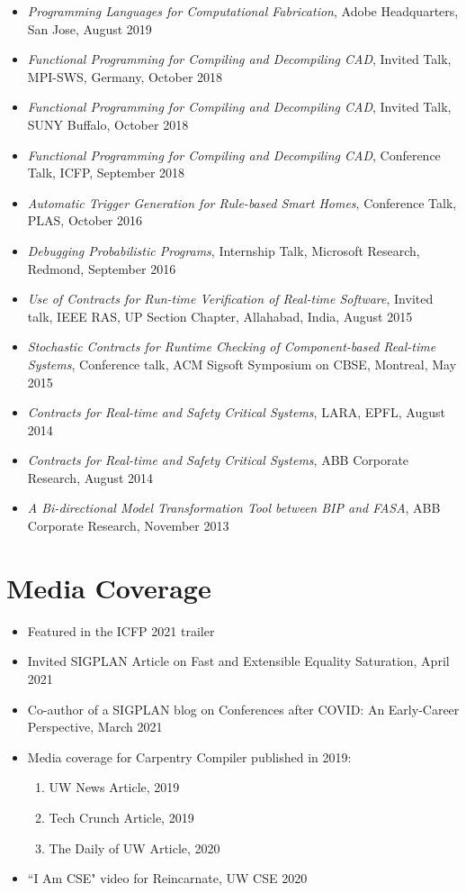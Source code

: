 \documentclass[margin, 10pt]{res} %
\begin{document}
\begin{resume}
\begin{itemize}[itemsep=.7pt]
 \item {\sl Programming Languages for Computational Fabrication}, Adobe Headquarters, San Jose, August 2019
 \item {\sl Functional Programming for Compiling and Decompiling CAD}, Invited Talk, MPI-SWS, Germany, October 2018
 \item {\sl Functional Programming for Compiling and Decompiling CAD}, Invited Talk, SUNY Buffalo, October 2018
 \item {\sl Functional Programming for Compiling and Decompiling CAD}, Conference  Talk, ICFP, September 2018
 \item {\sl Automatic Trigger Generation for Rule-based Smart Homes}, Conference Talk, PLAS, October 2016
 \item {\sl Debugging Probabilistic Programs}, Internship Talk, Microsoft Research, Redmond, September 2016
 \item {\sl Use of Contracts for Run-time Verification of Real-time Software}, Invited talk, IEEE RAS, UP Section Chapter, Allahabad, India, August 2015
 \item {\sl Stochastic Contracts for Runtime Checking of Component-based Real-time Systems}, Conference talk, ACM Sigsoft Symposium on CBSE, Montreal, May 2015
 \item {\sl Contracts for Real-time and Safety Critical Systems}, LARA, EPFL, August 2014
 \item {\sl Contracts for Real-time and Safety Critical Systems}, ABB Corporate Research, August 2014
 \item {\sl A Bi-directional Model Transformation Tool between BIP and FASA}, ABB Corporate Research, November 2013
 \end{itemize}

\section{Media Coverage}
\begin{itemize}
  \item Featured in the ICFP 2021 trailer
  \item Invited SIGPLAN Article on Fast and Extensible Equality Saturation, April 2021
  \item Co-author of a SIGPLAN blog on Conferences after COVID: An Early-Career Perspective, March 2021
  \item Media coverage for Carpentry Compiler published in 2019:
    \begin{enumerate}
      \item UW News Article, 2019
      \item Tech Crunch Article, 2019
      \item The Daily of UW Article, 2020
    \end{enumerate}
  \item ``I Am CSE" video for Reincarnate, UW CSE 2020
 \end{itemize}


\end{resume}
\end{document}
